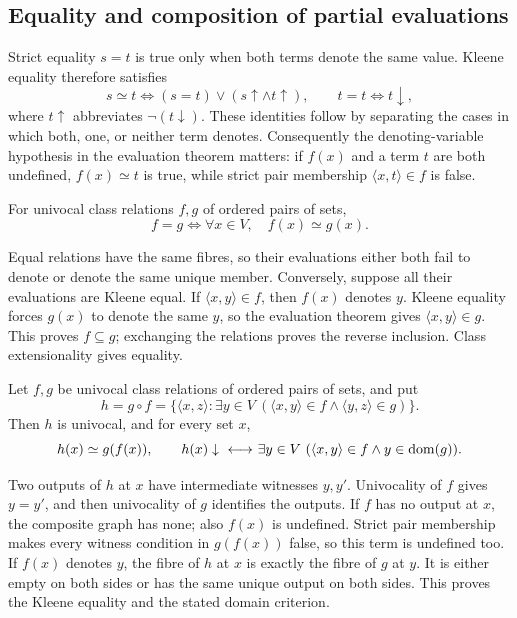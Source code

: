 \subsection{Equality and composition of partial evaluations}
Strict equality $s=t$ is true only when both terms denote the same value.
Kleene equality therefore satisfies
\[
s\simeq t\iff (s=t)\lor(s\uparrow\land t\uparrow),
\qquad t=t\iff t\downarrow,
\]
where $t\uparrow$ abbreviates $\neg(t\downarrow)$. These identities follow
by separating the cases in which both, one, or neither term denotes.
Consequently the denoting-variable hypothesis in the evaluation theorem
matters: if $f(x)$ and a term $t$ are both undefined, $f(x)\simeq t$ is
true, while strict pair membership $\langle x,t\rangle\in f$ is false.

\begin{theorem}
For univocal class relations $f,g$ of ordered pairs of sets,
\[
f=g\iff \forall x\in V,\quad f(x)\simeq g(x).
\]
\end{theorem}
\Proof
Equal relations have the same fibres, so their evaluations either both
fail to denote or denote the same unique member. Conversely, suppose
all their evaluations are Kleene equal. If $\langle x,y\rangle\in f$,
then $f(x)$ denotes $y$. Kleene equality forces $g(x)$ to denote the same
$y$, so the evaluation theorem gives $\langle x,y\rangle\in g$.
This proves $f\subseteq g$; exchanging the relations proves the reverse
inclusion. Class extensionality gives equality.
\Done

\begin{theorem}
Let $f,g$ be univocal class relations of ordered pairs of sets, and put
\[
h=g\circ f=\{\langle x,z\rangle:
       \exists y\in V\ (\langle x,y\rangle\in f
                         \land\langle y,z\rangle\in g)\}.
\]
Then $h$ is univocal, and for every set $x$,
\[
h(x)\simeq g(f(x)),
\qquad
h(x)\downarrow{\ \longleftrightarrow\ }
\exists y\in V\ (\langle x,y\rangle\in f\land y\in\mathrm{dom}(g)).
\]
\end{theorem}
\Proof
Two outputs of $h$ at $x$ have intermediate witnesses $y,y'$. Univocality
of $f$ gives $y=y'$, and then univocality of $g$ identifies the outputs.
If $f$ has no output at $x$, the composite graph has none; also $f(x)$
is undefined. Strict pair membership makes every witness condition in
$g(f(x))$ false, so this term is undefined too. If $f(x)$ denotes $y$,
the fibre of $h$ at $x$ is exactly the fibre of $g$ at $y$. It is either
empty on both sides or has the same unique output on both sides. This
proves the Kleene equality and the stated domain criterion.
\Done

